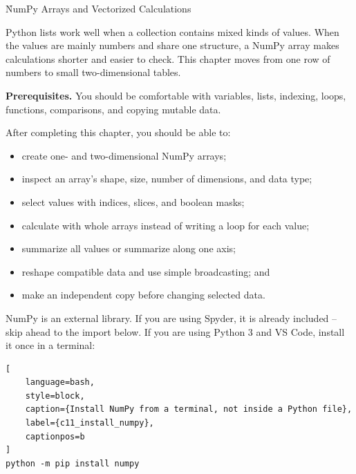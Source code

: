
\h{NumPy Arrays and Vectorized Calculations}
\label{ch:11}

Python lists work well when a collection contains mixed kinds of values. When
the values are mainly numbers and share one structure, a NumPy array makes
calculations shorter and easier to check. This chapter moves from one row of
numbers to small two-dimensional tables.

\begin{NoteBox}
\textbf{Prerequisites.} You should be comfortable with variables, lists,
indexing, loops, functions, comparisons, and copying mutable data.
\end{NoteBox}

\begin{tcolorbox}[title=Learning outcomes,colframe=orange,colback=white,arc=2mm]
After completing this chapter, you should be able to:
\begin{itemize}
    \item create one- and two-dimensional NumPy arrays;
    \item inspect an array's shape, size, number of dimensions, and data type;
    \item select values with indices, slices, and boolean masks;
    \item calculate with whole arrays instead of writing a loop for each value;
    \item summarize all values or summarize along one axis;
    \item reshape compatible data and use simple broadcasting; and
    \item make an independent copy before changing selected data.
\end{itemize}
\end{tcolorbox}


NumPy is an external library. If you are using Spyder, it is already
included -- skip ahead to the import below. If you are using Python 3 and
VS Code, install it once in a terminal:

\begin{lstlisting}[
    language=bash,
    style=block,
    caption={Install NumPy from a terminal, not inside a Python file},
    label={c11_install_numpy},
    captionpos=b
]
python -m pip install numpy
\end{lstlisting}


